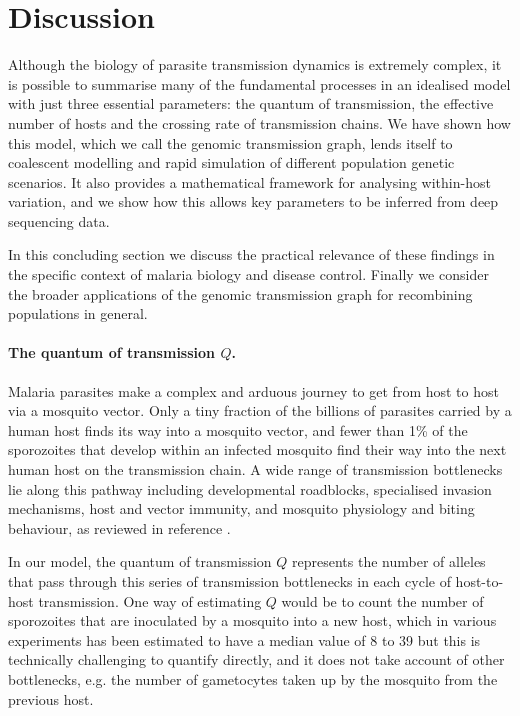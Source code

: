 \documentclass[_main.tex]{subfiles}
\begin{document}
\section*{Discussion}

Although the biology of parasite transmission dynamics is extremely complex, it is possible to summarise many of the fundamental processes in an idealised model with just three essential parameters: the quantum of transmission, the effective number of hosts and the crossing rate of transmission chains.  We have shown how this model, which we call the genomic transmission graph, lends itself to coalescent modelling and rapid simulation of different population genetic scenarios.  It also provides a mathematical framework for analysing within-host variation, and we show how this allows key parameters to be inferred from deep sequencing data.  

In this concluding section we discuss the practical relevance of these findings in the specific context of malaria biology and disease control.  Finally we consider the broader applications of the genomic transmission graph for recombining populations in general.

\paragraph{The quantum of transmission $Q$.}   Malaria parasites make a complex and arduous journey to get from host to host via a mosquito vector.  Only a tiny fraction of the billions of parasites carried by a human host finds its way into a mosquito vector, and fewer than 1\% of the sporozoites that develop within an infected mosquito find their way into the next human host on the transmission chain.  A wide range of transmission bottlenecks lie along this pathway including developmental roadblocks, specialised invasion mechanisms, host and vector immunity, and mosquito physiology and biting behaviour, as reviewed in reference \cite{Graumans2020}.

In our model, the quantum of transmission $Q$ represents the number of alleles that pass through this series of transmission bottlenecks in each cycle of host-to-host transmission. One way of estimating $Q$ would be to count the number of sporozoites that are inoculated by a mosquito into a new host, which in various experiments has been estimated to have a median value of 8 to 39 \cite{Graumans2020} but this is technically challenging to quantify directly, and it does not take account of other bottlenecks, e.g. the number of gametocytes taken up by the mosquito from the previous host.  
\end{document}
